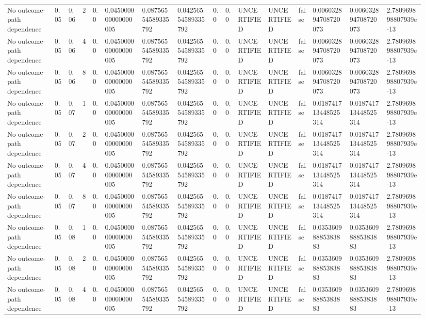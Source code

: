 \begin{tabular}{llllllllllllllll}
No outcome-path dependence & 0.05 & 0.06 & 2 & 0.0 & 0.045000000000000005 & 0.08756554589335792 & 0.04256554589335792 & 0.0 & 0.0 & UNCERTIFIED & UNCERTIFIED & false & 0.006032894708720073 & 0.006032894708720073 & 2.780969898807939e-13 \\
No outcome-path dependence & 0.05 & 0.06 & 4 & 0.0 & 0.045000000000000005 & 0.08756554589335792 & 0.04256554589335792 & 0.0 & 0.0 & UNCERTIFIED & UNCERTIFIED & false & 0.006032894708720073 & 0.006032894708720073 & 2.780969898807939e-13 \\
No outcome-path dependence & 0.05 & 0.06 & 8 & 0.0 & 0.045000000000000005 & 0.08756554589335792 & 0.04256554589335792 & 0.0 & 0.0 & UNCERTIFIED & UNCERTIFIED & false & 0.006032894708720073 & 0.006032894708720073 & 2.780969898807939e-13 \\
No outcome-path dependence & 0.05 & 0.07 & 1 & 0.0 & 0.045000000000000005 & 0.08756554589335792 & 0.04256554589335792 & 0.0 & 0.0 & UNCERTIFIED & UNCERTIFIED & false & 0.018741713448525314 & 0.018741713448525314 & 2.780969898807939e-13 \\
No outcome-path dependence & 0.05 & 0.07 & 2 & 0.0 & 0.045000000000000005 & 0.08756554589335792 & 0.04256554589335792 & 0.0 & 0.0 & UNCERTIFIED & UNCERTIFIED & false & 0.018741713448525314 & 0.018741713448525314 & 2.780969898807939e-13 \\
No outcome-path dependence & 0.05 & 0.07 & 4 & 0.0 & 0.045000000000000005 & 0.08756554589335792 & 0.04256554589335792 & 0.0 & 0.0 & UNCERTIFIED & UNCERTIFIED & false & 0.018741713448525314 & 0.018741713448525314 & 2.780969898807939e-13 \\
No outcome-path dependence & 0.05 & 0.07 & 8 & 0.0 & 0.045000000000000005 & 0.08756554589335792 & 0.04256554589335792 & 0.0 & 0.0 & UNCERTIFIED & UNCERTIFIED & false & 0.018741713448525314 & 0.018741713448525314 & 2.780969898807939e-13 \\
No outcome-path dependence & 0.05 & 0.08 & 1 & 0.0 & 0.045000000000000005 & 0.08756554589335792 & 0.04256554589335792 & 0.0 & 0.0 & UNCERTIFIED & UNCERTIFIED & false & 0.03536098885383883 & 0.03536098885383883 & 2.780969898807939e-13 \\
No outcome-path dependence & 0.05 & 0.08 & 2 & 0.0 & 0.045000000000000005 & 0.08756554589335792 & 0.04256554589335792 & 0.0 & 0.0 & UNCERTIFIED & UNCERTIFIED & false & 0.03536098885383883 & 0.03536098885383883 & 2.780969898807939e-13 \\
No outcome-path dependence & 0.05 & 0.08 & 4 & 0.0 & 0.045000000000000005 & 0.08756554589335792 & 0.04256554589335792 & 0.0 & 0.0 & UNCERTIFIED & UNCERTIFIED & false & 0.03536098885383883 & 0.03536098885383883 & 2.780969898807939e-13 \\

\end{tabular}
